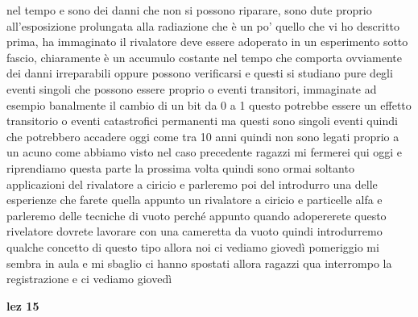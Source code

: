 {nel tempo e sono dei danni che non si possono riparare, sono dute proprio all'esposizione prolungata alla radiazione che è un po' quello che vi ho descritto prima, ha immaginato il rivalatore deve essere adoperato in un esperimento sotto fascio, chiaramente è un accumulo costante nel tempo che comporta ovviamente dei danni irreparabili oppure possono verificarsi e questi si studiano pure degli eventi singoli che possono essere proprio o eventi transitori, immaginate ad esempio banalmente il cambio di un bit da 0 a 1 questo potrebbe essere un effetto transitorio o eventi catastrofici permanenti ma questi sono singoli eventi quindi che potrebbero accadere oggi come tra 10 anni quindi non sono legati proprio a un acuno come abbiamo visto nel caso precedente ragazzi mi fermerei qui oggi e riprendiamo questa parte la prossima volta quindi sono ormai soltanto applicazioni del rivalatore a ciricio e parleremo poi del introdurro una delle esperienze che farete quella appunto un rivalatore a ciricio e particelle alfa e parleremo delle tecniche di vuoto perché appunto quando adopererete questo rivelatore dovrete lavorare con una cameretta da vuoto quindi introdurremo qualche concetto di questo tipo allora noi ci vediamo giovedì pomeriggio mi sembra in aula e mi sbaglio ci hanno spostati allora ragazzi qua interrompo la registrazione e ci vediamo giovedì

\textbf{lez 15}

}
